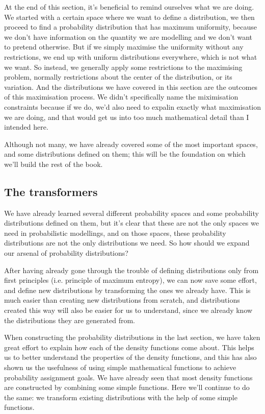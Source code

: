 \documentclass[11pt]{article}
\begin{document}
\begin{enumerate}
At the end of this section, it's beneficial to remind ourselves what we are doing. We started with a certain space where we want to define a distribution, we then proceed to find a probability distribution that has maximum uniformity, because we don't have information on the quantity we are modelling and we don't want to pretend otherwise. But if we simply maximise the uniformity without any restrictions, we end up with uniform distributions everywhere, which is not what we want. So instead, we generally apply some restrictions to the maximising problem, normally restrictions about the center of the distribution, or its variation. And the distributions we have covered in this section are the outcomes of this maximisation process. We didn't specifically name the miximisation constraints because if we do, we'd also need to expalin exactly what maximisation we are doing, and that would get us into too much mathematical detail than I intended here.

Although not many, we have already covered some of the most important spaces, and some distributions defined on them; this will be the foundation on which we'll build the rest of the book.
\end{enumerate}

\subsection{The transformers}
\label{sec:org426b318}

We have already learned several different probability spaces and some probability distributions defined on them, but it's clear that these are not the only spaces we need in probabilistic modellings, and on those spaces, these probability distributions are not the only distributions we need. So how should we expand our arsenal of probability distributions?

After having already gone through the trouble of defining distributions only from first principles (i.e. principle of maximum entropy), we can now save some effort, and define new distributions by transforming the ones we already have. This is much easier than creating new distributions from scratch, and distributions created this way will also be easier for us to understand, since we already know the distributions they are generated from.

When constructing the probability distributions in the last section, we have taken great effort to explain how each of the density functions come about. This helps us to better understand the properties of the density functions, and this has also shown us the usefulness of using simple mathematical functions to achieve probability assignment goals. We have already seen that most density functions are constructed by combining some simple functions. Here we'll continue to do the same: we transform existing distributions with the help of some simple functions.
\end{document}
